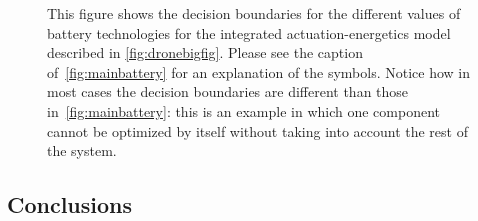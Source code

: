 \begin{figure}
\begin{centering}
{\begin{centering}
\par\end{centering}
}
\par\end{centering}
\begin{centering}
\par\end{centering}
\caption{\label{fig:drone_choice}This figure shows the decision boundaries
for the different values of battery technologies for the integrated
actuation-energetics model described in \cref{fig:dronebigfig}. Please
see the caption of~\cref{fig:mainbattery} for an explanation of the
symbols. Notice how in most cases the decision boundaries are different
than those in~\cref{fig:mainbattery}: this is an example in which
one component cannot be optimized by itself without taking into account
the rest of the system.}
\end{figure}






\subsection{Conclusions}

